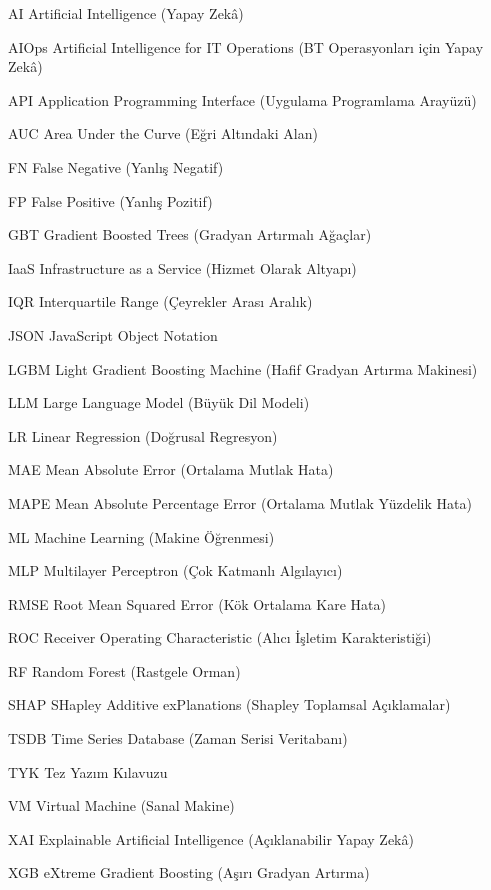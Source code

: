 \begin{simge}
	\item [AI]     Artificial Intelligence (Yapay Zekâ)
	\item [AIOps]  Artificial Intelligence for IT Operations (BT Operasyonları için Yapay Zekâ)
	\item [API]    Application Programming Interface (Uygulama Programlama Arayüzü)
	\item [AUC]    Area Under the Curve (Eğri Altındaki Alan)
	\item [FN]     False Negative (Yanlış Negatif)
	\item [FP]     False Positive (Yanlış Pozitif)
	\item [GBT]    Gradient Boosted Trees (Gradyan Artırmalı Ağaçlar)
	\item [IaaS]   Infrastructure as a Service (Hizmet Olarak Altyapı)
	\item [IQR]    Interquartile Range (Çeyrekler Arası Aralık)
	\item [JSON]   JavaScript Object Notation
	\item [LGBM]   Light Gradient Boosting Machine (Hafif Gradyan Artırma Makinesi)
	\item [LLM]    Large Language Model (Büyük Dil Modeli)
	\item [LR]     Linear Regression (Doğrusal Regresyon)
	\item [MAE]    Mean Absolute Error (Ortalama Mutlak Hata)
	\item [MAPE]   Mean Absolute Percentage Error (Ortalama Mutlak Yüzdelik Hata)
	\item [ML]     Machine Learning (Makine Öğrenmesi)
	\item [MLP]    Multilayer Perceptron (Çok Katmanlı Algılayıcı)
	\item [RMSE]   Root Mean Squared Error (Kök Ortalama Kare Hata)
	\item [ROC]    Receiver Operating Characteristic (Alıcı İşletim Karakteristiği)
	\item [RF]     Random Forest (Rastgele Orman)
	\item [SHAP]   SHapley Additive exPlanations (Shapley Toplamsal Açıklamalar)
	\item [TSDB]   Time Series Database (Zaman Serisi Veritabanı)
	\item [TYK]    Tez Yazım Kılavuzu
	\item [VM]     Virtual Machine (Sanal Makine)
	\item [XAI]    Explainable Artificial Intelligence (Açıklanabilir Yapay Zekâ)
	\item [XGB]    eXtreme Gradient Boosting (Aşırı Gradyan Artırma)
\end{simge}
